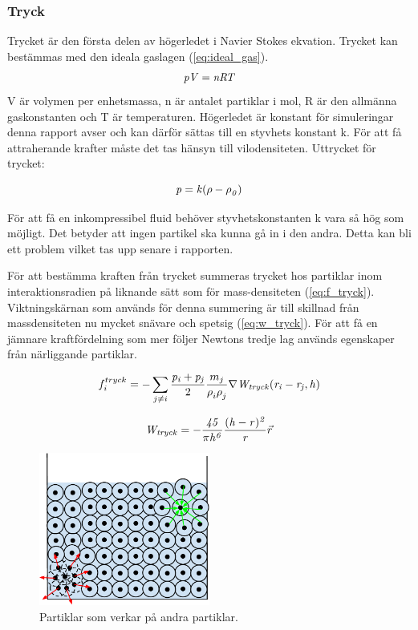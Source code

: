 \documentclass[a4paper,12pt,oneside,final]{extarticle}
\begin{document}
\subsubsection{Tryck}
Trycket är den första delen av högerledet i Navier Stokes ekvation.
Trycket kan bestämmas med den ideala gaslagen (\ref{eq:ideal_gas}).
\begin{equation} \label{eq:ideal_gas}
{\it pV = nRT}
\end{equation}
V är volymen per enhetsmassa, n är antalet partiklar i mol, R är den allmänna gaskonstanten och T är temperaturen.
Högerledet är konstant för simuleringar denna rapport avser och kan därför sättas till en styvhets konstant k. 
För att få attraherande krafter måste det tas hänsyn till vilodensiteten. Uttrycket för trycket:

\begin{equation}
{\it p = k(\rho - \rho^{}_{0})}
\end{equation}


För att få en inkompressibel fluid behöver styvhetskonstanten k vara så hög som möjligt. Det betyder att ingen partikel ska kunna gå in i den andra. Detta kan bli ett problem vilket tas upp senare i rapporten.

För att bestämma kraften från trycket summeras trycket hos partiklar inom interaktionsradien på liknande sätt som för mass-densiteten (\ref{eq:f_tryck}).
Viktningskärnan som används för denna summering är till skillnad från massdensiteten nu mycket snävare och spetsig (\ref{eq:w_tryck}).
För att få en jämnare kraftfördelning som mer följer Newtons tredje lag används egenskaper från närliggande partiklar.

\begin{equation} \label{eq:f_tryck}
f^{tryck}_i = - \sum_{j \neq i} \frac{\it p_i + p_j}{2} \frac{m_j}{\rho^{}_{i} \rho^{}_{j}} \nabla {\it W_{tryck} (r_i - r_j,h)}
\end{equation}

\begin{equation} \label{eq:w_tryck}
{\it W_{tryck} = -\frac{45}{\pi h^6}\frac{(h-r)^2}{r}} \vec{r}
\end{equation}


\begin{figure}[H]
  \centering
    \includegraphics[width=0.5\textwidth]{bilder/partiklar_komprimering}
  \caption{Partiklar som verkar på andra partiklar.}
\end{figure}
\end{document}
